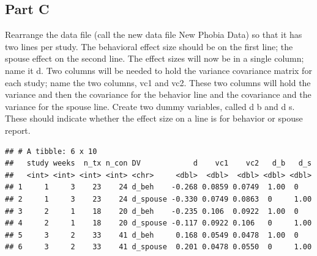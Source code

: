 \documentclass[]{article}
\newenvironment{Shaded}{\begin{snugshade}}{\end{snugshade}}
\newcommand{\KeywordTok}[1]{\textcolor[rgb]{0.13,0.29,0.53}{\textbf{#1}}}
\newcommand{\DataTypeTok}[1]{\textcolor[rgb]{0.13,0.29,0.53}{#1}}
\newcommand{\DecValTok}[1]{\textcolor[rgb]{0.00,0.00,0.81}{#1}}
\newcommand{\StringTok}[1]{\textcolor[rgb]{0.31,0.60,0.02}{#1}}
\newcommand{\CommentTok}[1]{\textcolor[rgb]{0.56,0.35,0.01}{\textit{#1}}}
\newcommand{\OperatorTok}[1]{\textcolor[rgb]{0.81,0.36,0.00}{\textbf{#1}}}
\newcommand{\NormalTok}[1]{#1}
\begin{document}
\subsection{Part C}\label{part-c}

Rearrange the data file (call the new data file New Phobia Data) so that
it has two lines per study. The behavioral effect size should be on the
first line; the spouse effect on the second line. The effect sizes will
now be in a single column; name it d. Two columns will be needed to hold
the variance covariance matrix for each study; name the two columns, vc1
and vc2. These two columns will hold the variance and then the
covariance for the behavior line and the covariance and the variance for
the spouse line. Create two dummy variables, called d b and d s. These
should indicate whether the effect size on a line is for behavior or
spouse report.

\begin{Shaded}
\end{Shaded}

\begin{verbatim}
## # A tibble: 6 x 10
##   study weeks  n_tx n_con DV            d    vc1    vc2   d_b   d_s
##   <int> <int> <int> <int> <chr>     <dbl>  <dbl>  <dbl> <dbl> <dbl>
## 1     1     3    23    24 d_beh    -0.268 0.0859 0.0749  1.00  0   
## 2     1     3    23    24 d_spouse -0.330 0.0749 0.0863  0     1.00
## 3     2     1    18    20 d_beh    -0.235 0.106  0.0922  1.00  0   
## 4     2     1    18    20 d_spouse -0.117 0.0922 0.106   0     1.00
## 5     3     2    33    41 d_beh     0.168 0.0549 0.0478  1.00  0   
## 6     3     2    33    41 d_spouse  0.201 0.0478 0.0550  0     1.00
\end{verbatim}
\end{document}
